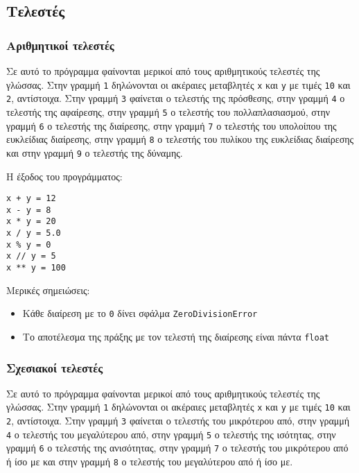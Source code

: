 \documentclass[14pt]{extreport}
\begin{document}
\subsection{Τελεστές}

\subsubsection{Αριθμητικοί τελεστές}


Σε αυτό το πρόγραμμα φαίνονται μερικοί από τους αριθμητικούς τελεστές της γλώσσας. Στην γραμμή \lstinline{1} δηλώνονται οι ακέραιες μεταβλητές \lstinline{x} και \lstinline{y} με τιμές \lstinline{10} και \lstinline{2}, αντίστοιχα. Στην γραμμή \lstinline{3} φαίνεται ο τελεστής της πρόσθεσης, στην γραμμή \lstinline{4} ο τελεστής της αφαίρεσης, στην γραμμή \lstinline{5} ο τελεστής του πολλαπλασιασμού, στην γραμμή \lstinline{6} ο τελεστής της διαίρεσης,  στην γραμμή \lstinline{7} ο τελεστής του υπολοίπου της ευκλείδιας διαίρεσης,  στην γραμμή \lstinline{8} ο τελεστής του πυλίκου της ευκλείδιας διαίρεσης και στην γραμμή \lstinline{9} ο τελεστής της δύναμης.

Η έξοδος του προγράμματος:
\begin{lstlisting}
x + y = 12
x - y = 8
x * y = 20
x / y = 5.0
x % y = 0
x // y = 5
x ** y = 100
\end{lstlisting}

Μερικές σημειώσεις:
\begin{itemize}
    \item Κάθε διαίρεση με το \lstinline{0} δίνει σφάλμα \lstinline{ZeroDivisionError}
    \item Το αποτέλεσμα της πράξης με τον τελεστή της διαίρεσης είναι πάντα \lstinline{float}
\end{itemize}

\subsubsection{Σχεσιακοί τελεστές}


Σε αυτό το πρόγραμμα φαίνονται μερικοί από τους αριθμητικούς τελεστές της γλώσσας. Στην γραμμή \lstinline{1} δηλώνονται οι ακέραιες μεταβλητές \lstinline{x} και \lstinline{y} με τιμές \lstinline{10} και \lstinline{2}, αντίστοιχα. Στην γραμμή \lstinline{3} φαίνεται ο τελεστής του μικρότερου από, στην γραμμή \lstinline{4} ο τελεστής του μεγαλύτερου από, στην γραμμή \lstinline{5} ο τελεστής της ισότητας, στην γραμμή \lstinline{6} ο τελεστής της ανισότητας,  στην γραμμή \lstinline{7} ο τελεστής του μικρότερου από ή ίσο με και στην γραμμή \lstinline{8} ο τελεστής του μεγαλύτερου από ή ίσο με.
\end{document}
